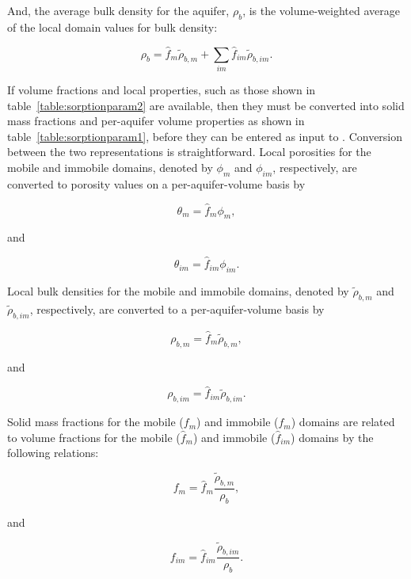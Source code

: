 \noindent And, the average bulk density for the aquifer, $\rho_b$, is the volume-weighted average of the local domain values for bulk density:

\begin{equation}
\label{eqn:rhob2}
\rho_{b} = \hat{f}_m \tilde{\rho}_{b, m} + \sum_{im}{\hat{f}_{im} \tilde{\rho}_{b, im}}.
\end{equation}

If volume fractions and local properties, such as those shown in table~\ref{table:sorptionparam2} are available, then they must be converted into solid mass fractions and per-aquifer volume properties as shown in table~\ref{table:sorptionparam1}, before they can be entered as input to \mf.  Conversion between the two representations is straightforward.  Local porosities for the mobile and immobile domains, denoted by $\phi_m$ and $\phi_{im}$, respectively, are converted to porosity values on a per-aquifer-volume basis by 

\begin{equation}
\label{eqn:theta1}
\theta_{m} = \hat{f}_{m} \phi_{m},
\end{equation}

\noindent and

\begin{equation}
\label{eqn:theta2}
\theta_{im} = \hat{f}_{im} \phi_{im}.
\end{equation}

\noindent Local bulk densities for the mobile and immobile domains, denoted by $\tilde{\rho}_{b, m}$ and $\tilde{\rho}_{b, im}$, respectively, are converted to a per-aquifer-volume basis by

\begin{equation}
\label{eqn:rhobm}
\rho_{b,m} = \hat{f}_m \tilde{\rho}_{b, m},
\end{equation}

\noindent and

\begin{equation}
\label{eqn:rhobim}
\rho_{b, im} = \hat{f}_{im} \tilde{\rho}_{b, im}.
\end{equation}

Solid mass fractions for the mobile ($f_{m}$) and immobile ($f_{m}$) domains are related to volume fractions for the mobile ($\hat{f}_m$) and immobile ($\hat{f}_{im}$) domains by the following relations: 

\begin{equation}
\label{eqn:fmfm}
f_{m} = \hat{f}_m \frac{\tilde{\rho}_{b, m}}{\rho_{b}},
\end{equation}

\noindent and 

\begin{equation}
\label{eqn:fimfim}
f_{im} = \hat{f}_{im} \frac{\tilde{\rho}_{b, im}}{\rho_{b}}.
\end{equation}
